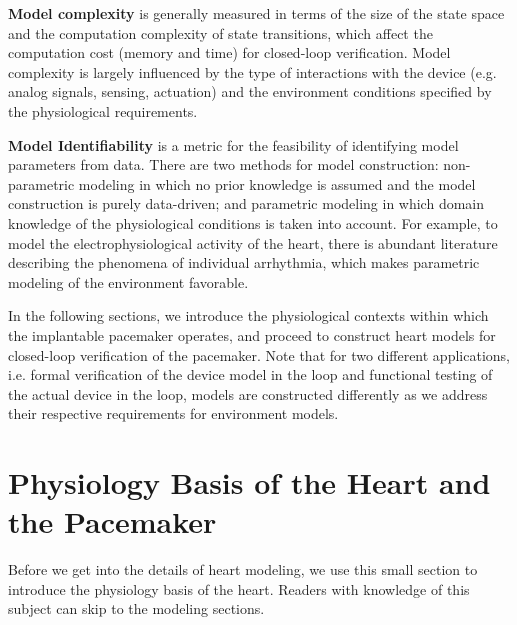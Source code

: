 \textbf{Model complexity} is generally measured in terms of the size of the state space and the computation complexity of state transitions, which affect the computation cost (memory and time) for closed-loop verification. Model complexity is largely influenced by the type of interactions with the device (e.g. analog signals, sensing, actuation) and the environment conditions specified by the physiological requirements. 

\textbf{Model Identifiability} is a metric for the feasibility of identifying model parameters from data. There are two methods for model construction: non-parametric modeling in which no prior knowledge is assumed and the model construction is purely data-driven; and parametric modeling in which domain knowledge of the physiological conditions is taken into account. For example, to model the electrophysiological activity of the heart, there is abundant literature describing the phenomena of individual arrhythmia, which makes parametric modeling of the environment favorable.



In the following sections, we introduce the physiological contexts within which the implantable pacemaker operates, and proceed to construct heart models for closed-loop verification of the pacemaker. Note that for two different applications, i.e. formal verification of the device model in the loop and functional testing of the actual device in the loop, models are constructed differently as we address their respective requirements for environment models. 

\section{Physiology Basis of the Heart and the Pacemaker}
Before we get into the details of heart modeling, we use this small section to introduce the physiology basis of the heart. Readers with knowledge of this subject can skip to the modeling sections.
